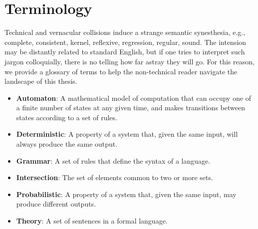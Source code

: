 \chapter*{\rm\bfseries Terminology}
\label{ch:terminology}

Technical and vernacular collisions induce a strange semantic synesthesia, e.g., complete, consistent, kernel, reflexive, regression, regular, sound. The intension may be distantly related to standard English, but if one tries to interpret such jargon colloquially, there is no telling how far astray they will go. For this reason, we provide a glossary of terms to help the non-technical reader navigate the landscape of this thesis.

\begin{itemize}
    \item \textbf{Automaton}: A mathematical model of computation that can occupy one of a finite number of states at any given time, and makes transitions between states according to a set of rules.
    \item \textbf{Deterministic}: A property of a system that, given the same input, will always produce the same output.
    \item \textbf{Grammar}: A set of rules that define the syntax of a language.
    \item \textbf{Intersection}: The set of elements common to two or more sets.
    \item \textbf{Probabilistic}: A property of a system that, given the same input, may produce different outputs.
    \item \textbf{Theory}: A set of sentences in a formal language.
\end{itemize}